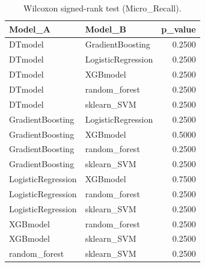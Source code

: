 \begin{table}[t]
\centering
\begin{tabular}{llr}
\toprule
Model_A & Model_B & p_value \\
\midrule
DTmodel & GradientBoosting & 0.2500 \\
DTmodel & LogisticRegression & 0.2500 \\
DTmodel & XGBmodel & 0.2500 \\
DTmodel & random_forest & 0.2500 \\
DTmodel & sklearn_SVM & 0.2500 \\
GradientBoosting & LogisticRegression & 0.2500 \\
GradientBoosting & XGBmodel & 0.5000 \\
GradientBoosting & random_forest & 0.2500 \\
GradientBoosting & sklearn_SVM & 0.2500 \\
LogisticRegression & XGBmodel & 0.7500 \\
LogisticRegression & random_forest & 0.2500 \\
LogisticRegression & sklearn_SVM & 0.2500 \\
XGBmodel & random_forest & 0.2500 \\
XGBmodel & sklearn_SVM & 0.2500 \\
random_forest & sklearn_SVM & 0.2500 \\
\bottomrule
\end{tabular}
\caption{Wilcoxon signed-rank test (Micro_Recall).}
\label{tab:wilcoxon_Micro_Recall}
\end{table}